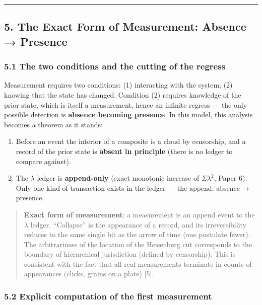\documentclass[
]{article}
\providecommand{\tightlist}{%
  \setlength{\itemsep}{0pt}\setlength{\parskip}{0pt}}
\begin{document}
\begin{center}\rule{0.5\linewidth}{0.5pt}\end{center}

\subsection{5. The Exact Form of Measurement: Absence →
Presence}\label{the-exact-form-of-measurement-absence-presence}

\subsubsection{5.1 The two conditions and the cutting of the
regress}\label{the-two-conditions-and-the-cutting-of-the-regress}

Measurement requires two conditions: (1) interacting with the system;
(2) knowing that the state has changed. Condition (2) requires knowledge
of the prior state, which is itself a measurement, hence an infinite
regress --- the only possible detection is \textbf{absence becoming
presence}. In this model, this analysis becomes a theorem as it stands:

\begin{enumerate}
\def\labelenumi{\arabic{enumi}.}
\tightlist
\item
  Before an event the interior of a composite is a cloud by censorship,
  and a record of the prior state is \textbf{absent in principle} (there
  is no ledger to compare against).
\item
  The \(\lambda\) ledger is \textbf{append-only} (exact monotonic
  increase of \(\Sigma\lambda^2\), Paper 6). Only one kind of
  transaction exists in the ledger --- the append: absence → presence.
\end{enumerate}

\begin{quote}
\textbf{Exact form of measurement}: a measurement is an append event to
the \(\lambda\) ledger. ``Collapse'' is the appearance of a record, and
its irreversibility reduces to the same single bit as the arrow of time
(one postulate fewer). The arbitrariness of the location of the
Heisenberg cut corresponds to the boundary of hierarchical jurisdiction
(defined by censorship). This is consistent with the fact that all real
measurements terminate in counts of appearances (clicks, grains on a
plate) {[}5{]}.
\end{quote}

\subsubsection{5.2 Explicit computation of the first
measurement}\label{explicit-computation-of-the-first-measurement}
\end{document}
